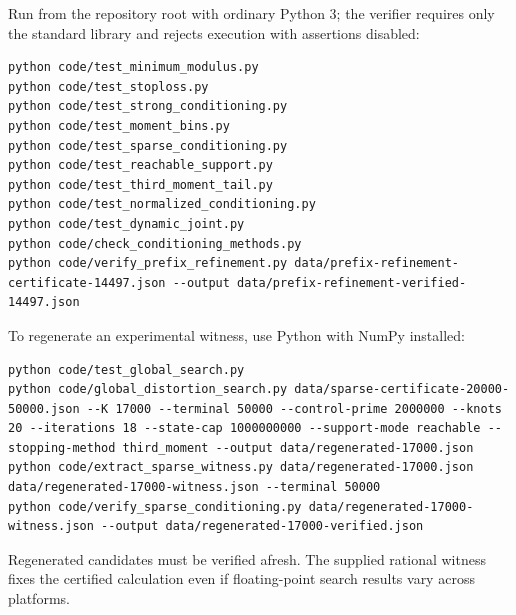 \documentclass[11pt]{article}
\begin{document}
Run from the repository root with ordinary Python 3; the verifier requires
only the standard library and rejects execution with assertions disabled:
\begin{lstlisting}[basicstyle=\ttfamily\small,breaklines=true]
python code/test_minimum_modulus.py
python code/test_stoploss.py
python code/test_strong_conditioning.py
python code/test_moment_bins.py
python code/test_sparse_conditioning.py
python code/test_reachable_support.py
python code/test_third_moment_tail.py
python code/test_normalized_conditioning.py
python code/test_dynamic_joint.py
python code/check_conditioning_methods.py
python code/verify_prefix_refinement.py data/prefix-refinement-certificate-14497.json --output data/prefix-refinement-verified-14497.json
\end{lstlisting}
To regenerate an experimental witness, use Python with NumPy installed:
\begin{lstlisting}[basicstyle=\ttfamily\small,breaklines=true]
python code/test_global_search.py
python code/global_distortion_search.py data/sparse-certificate-20000-50000.json --K 17000 --terminal 50000 --control-prime 2000000 --knots 20 --iterations 18 --state-cap 1000000000 --support-mode reachable --stopping-method third_moment --output data/regenerated-17000.json
python code/extract_sparse_witness.py data/regenerated-17000.json data/regenerated-17000-witness.json --terminal 50000
python code/verify_sparse_conditioning.py data/regenerated-17000-witness.json --output data/regenerated-17000-verified.json
\end{lstlisting}
Regenerated candidates must be verified afresh. The supplied rational
witness fixes the certified calculation even if floating-point search
results vary across platforms.
\end{document}
